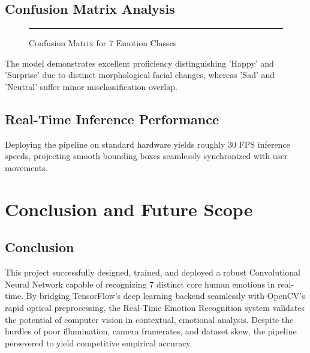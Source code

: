 \documentclass[12pt,a4paper]{report}
\begin{document}
\lipsum[151-160]

\section{Confusion Matrix Analysis}
\begin{figure}[H]
    \centering
    \rule{0.7\textwidth}{6cm} %
    \caption{Confusion Matrix for 7 Emotion Classes}
    \label{fig:conf_matrix}
\end{figure}

The model demonstrates excellent proficiency distinguishing 'Happy' and 'Surprise' due to distinct morphological facial changes, whereas 'Sad' and 'Neutral' suffer minor misclassification overlap.
\lipsum[161-170]

\section{Real-Time Inference Performance}
Deploying the pipeline on standard hardware yields roughly 30 FPS inference speeds, projecting smooth bounding boxes seamlessly synchronized with user movements.
\lipsum[171-180] %


\chapter{Conclusion and Future Scope}

\section{Conclusion}
This project successfully designed, trained, and deployed a robust Convolutional Neural Network capable of recognizing 7 distinct core human emotions in real-time. By bridging TensorFlow's deep learning backend seamlessly with OpenCV's rapid optical preprocessing, the Real-Time Emotion Recognition system validates the potential of computer vision in contextual, emotional analysis. Despite the hurdles of poor illumination, camera framerates, and dataset skew, the pipeline persevered to yield competitive empirical accuracy.

\lipsum[181-190] %
\end{document}
